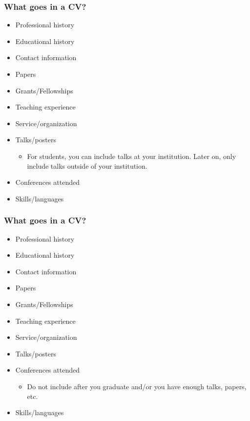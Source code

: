 \documentclass{beamer}
\begin{document}
\begin{frame}\frametitle{What goes in a CV?}

\begin{itemize}
	\item Professional history
	\item Educational history
	\item Contact information
	\item Papers
	\item Grants/Fellowships
	\item Teaching experience
	\item Service/organization
	\item Talks/posters
	\begin{itemize}
	\item For students, you can include talks at your institution. Later on, only include talks outside of your institution.
\end{itemize}
	\item Conferences attended
	\item Skills/languages
\end{itemize}

\end{frame}


\begin{frame}\frametitle{What goes in a CV?}

\begin{itemize}
	\item Professional history
	\item Educational history
	\item Contact information
	\item Papers
	\item Grants/Fellowships
	\item Teaching experience
	\item Service/organization
	\item Talks/posters
	\item Conferences attended
	\begin{itemize}
		\item Do not include after you graduate and/or you have enough talks, papers, etc.
	\end{itemize}
	\item Skills/languages
\end{itemize}

\end{frame}
\end{document}
